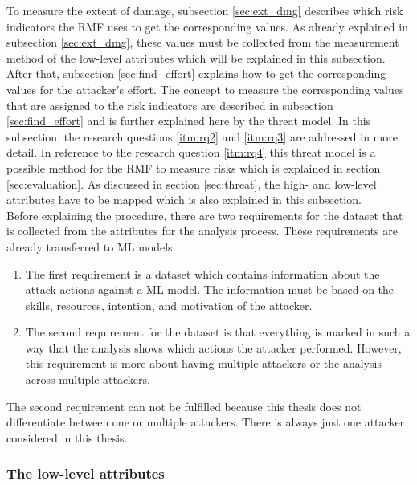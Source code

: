 To measure the extent of damage, subsection \ref{sec:ext_dmg} describes which risk indicators the RMF uses to get the corresponding values. As already explained in subsection \ref{sec:ext_dmg}, these values must be collected from the measurement method of the low-level attributes which will be explained in this subsection. After that, subsection \ref{sec:find_effort} explains how to get the corresponding values for the attacker's effort. The concept to measure the corresponding values that are assigned to the risk indicators are described in subsection \ref{sec:find_effort} and is further
explained here by the threat model. In this subsection, the research questions \ref{itm:rq2} and \ref{itm:rq3} are addressed in more detail. In reference to the research question \ref{itm:rq4} this
threat model is a possible method for the RMF to measure risks which is explained in section \ref{sec:evaluation}. As discussed in section \ref{sec:threat}, the high- and low-level attributes have to be mapped which is also explained in this subsection. \\
Before explaining the procedure, there are two requirements for the dataset that is collected from the attributes \cite{DBLP:conf/crisis/DoynikovaNGK20} for the analysis process. These requirements are already transferred to ML models:

\begin{enumerate}
  \item The first requirement is a dataset which contains information about the attack actions against a ML model. The information must be based on the skills, resources, intention, and motivation of the attacker.
  \item The second requirement for the dataset is that everything is marked in such a way that the analysis shows which actions the attacker performed. However, this requirement is more about having multiple attackers or the analysis across multiple attackers.
\end{enumerate}

The second requirement can not be fulfilled because this thesis does not differentiate between one or multiple attackers. There is always just one attacker considered in this thesis.

\subsubsection*{The low-level attributes}

